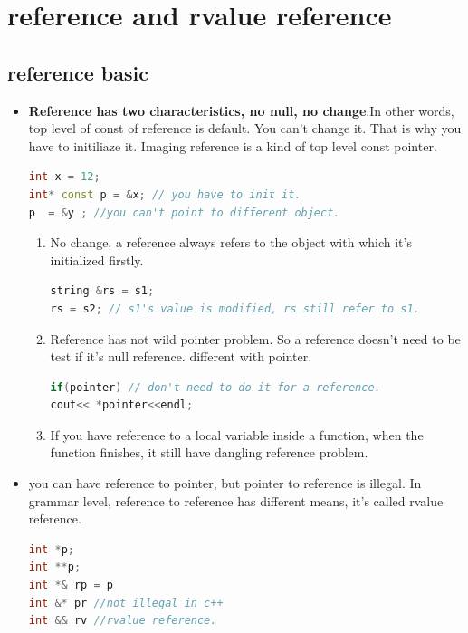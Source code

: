\documentclass[a4paper,12pt,twoside]{book}
\begin{document}
\section{reference and rvalue reference}
\subsection{reference basic}

\begin{itemize}
\item \textbf{Reference has two characteristics, no null, no change}.In other words, top level of const of reference is default. You can't change it. That is why you have to initiliaze it. Imaging reference is a kind of top level const pointer.
\begin{lstlisting}[frame=single, language=c++]
int x = 12;
int* const p = &x; // you have to init it.
p  = &y ; //you can't point to different object.
\end{lstlisting}

\begin{enumerate}
\item No change, a reference always refers to the object with which it's initialized firstly.
\begin{lstlisting}[frame=single, language=c++]
string &rs = s1;
rs = s2; // s1's value is modified, rs still refer to s1.
\end{lstlisting}

\item Reference has not wild pointer problem. So a reference doesn't need to be test if it's null reference. different with pointer. 
\begin{lstlisting}[frame=single, language=c++]
if(pointer) // don't need to do it for a reference.
cout<< *pointer<<endl;
\end{lstlisting}

\item If you have reference to a local variable inside a function, when the function finishes, it still have dangling reference problem. 
\end{enumerate}

\item you can have reference to pointer, but pointer to reference is illegal. In grammar level, reference to reference has different means, it's called rvalue reference. 
\begin{lstlisting}[frame=single, language=c++]
int *p;
int **p;
int *& rp = p
int &* pr //not illegal in c++
int && rv //rvalue reference.
\end{lstlisting}


\end{itemize}
\end{document}
